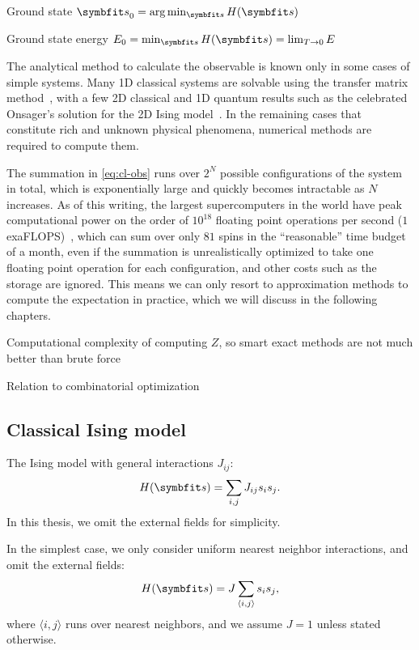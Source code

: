 Ground state $\vs_0 = \arg\min_\vs H(\vs)$

Ground state energy $E_0 = \min_\vs H(\vs) = \lim_{T \to 0} E$

The analytical method to calculate the observable is known only in some cases of simple systems. Many 1D classical systems are solvable using the transfer matrix method~\cite{chaikin1995principles5}, with a few 2D classical and 1D quantum results such as the celebrated Onsager's solution for the 2D Ising model~\cite{onsager1944crystal, baxter1995solvable,march2016exactly, caravelli2022some}. In the remaining cases that constitute rich and unknown physical phenomena, numerical methods are required to compute them.

The summation in \cref{eq:cl-obs} runs over $2^N$ possible configurations of the system in total, which is exponentially large and quickly becomes intractable as $N$ increases. As of this writing, the largest supercomputers in the world have peak computational power on the order of $10^{18}$ floating point operations per second ($1$ exaFLOPS)~\cite{kogge2022frontier}, which can sum over only $81$ spins in the ``reasonable'' time budget of a month, even if the summation is unrealistically optimized to take one floating point operation for each configuration, and other costs such as the storage are ignored. This means we can only resort to approximation methods to compute the expectation in practice, which we will discuss in the following chapters.

Computational complexity of computing $Z$, so smart exact methods are not much better than brute force

Relation to combinatorial optimization

\subsection{Classical Ising model}

The Ising model with general interactions $J_{i j}$:
\begin{equation}
H(\vs) = \sum_{i, j} J_{i j} s_i s_j.
\label{eq:cl-ising-general}
\end{equation}
In this thesis, we omit the external fields for simplicity.

In the simplest case, we only consider uniform nearest neighbor interactions, and omit the external fields:
\begin{equation}
H(\vs) = J \sum_{\langle i, j \rangle} s_i s_j,
\label{eq:cl-ising}
\end{equation}
where $\langle i, j \rangle$ runs over nearest neighbors, and we assume $J = 1$ unless stated otherwise.

